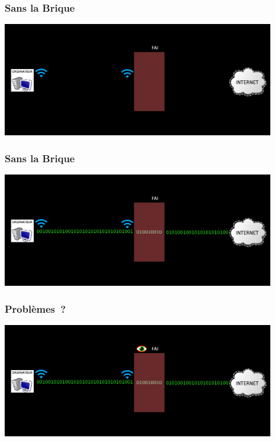 \documentclass[notes=hide]{beamer}
\begin{document}
\begin{frame}[t]
\frametitle{\textcolor{titre}{Sans la Brique}}
  \begin{center}
    \includegraphics[width=0.9\textwidth]{img2/connexion3.png}
  \end{center}
\end{frame}

\begin{frame}[t]
\frametitle{\textcolor{titre}{Sans la Brique}}
  \begin{center}
    \includegraphics[width=0.9\textwidth]{img2/connexion4.png}
  \end{center}
\end{frame}

\begin{frame}[t]
\frametitle{\textcolor{titre}{Problèmes~?}}
  \begin{center}
    \includegraphics[width=0.9\textwidth]{img2/connexion5.png}
  \end{center}
\end{frame}
\end{document}

